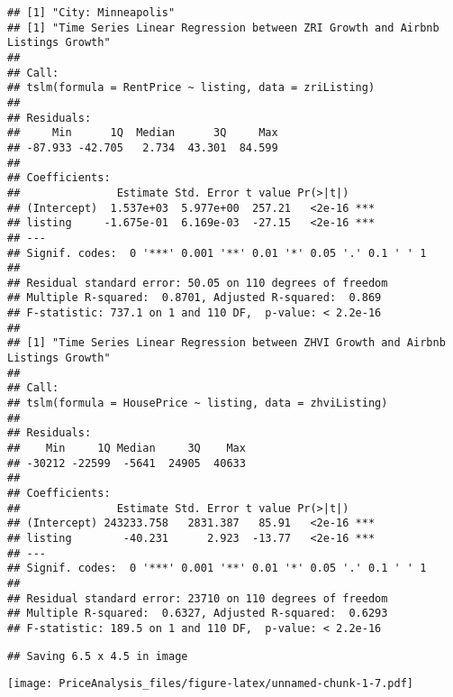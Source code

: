 \documentclass[
]{article}
\begin{document}
\begin{verbatim}
## [1] "City: Minneapolis"
## [1] "Time Series Linear Regression between ZRI Growth and Airbnb Listings Growth"
## 
## Call:
## tslm(formula = RentPrice ~ listing, data = zriListing)
## 
## Residuals:
##     Min      1Q  Median      3Q     Max 
## -87.933 -42.705   2.734  43.301  84.599 
## 
## Coefficients:
##               Estimate Std. Error t value Pr(>|t|)    
## (Intercept)  1.537e+03  5.977e+00  257.21   <2e-16 ***
## listing     -1.675e-01  6.169e-03  -27.15   <2e-16 ***
## ---
## Signif. codes:  0 '***' 0.001 '**' 0.01 '*' 0.05 '.' 0.1 ' ' 1
## 
## Residual standard error: 50.05 on 110 degrees of freedom
## Multiple R-squared:  0.8701, Adjusted R-squared:  0.869 
## F-statistic: 737.1 on 1 and 110 DF,  p-value: < 2.2e-16
## 
## [1] "Time Series Linear Regression between ZHVI Growth and Airbnb Listings Growth"
## 
## Call:
## tslm(formula = HousePrice ~ listing, data = zhviListing)
## 
## Residuals:
##    Min     1Q Median     3Q    Max 
## -30212 -22599  -5641  24905  40633 
## 
## Coefficients:
##               Estimate Std. Error t value Pr(>|t|)    
## (Intercept) 243233.758   2831.387   85.91   <2e-16 ***
## listing        -40.231      2.923  -13.77   <2e-16 ***
## ---
## Signif. codes:  0 '***' 0.001 '**' 0.01 '*' 0.05 '.' 0.1 ' ' 1
## 
## Residual standard error: 23710 on 110 degrees of freedom
## Multiple R-squared:  0.6327, Adjusted R-squared:  0.6293 
## F-statistic: 189.5 on 1 and 110 DF,  p-value: < 2.2e-16
\end{verbatim}

\begin{verbatim}
## Saving 6.5 x 4.5 in image
\end{verbatim}

\texttt{[image: PriceAnalysis\_files/figure-latex/unnamed-chunk-1-7.pdf]}
\end{document}
